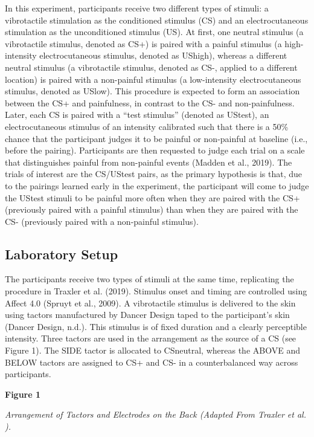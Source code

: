 \documentclass{article}
\begin{document}
In this experiment, participants receive two different types of stimuli: a vibrotactile stimulation as the conditioned stimulus (CS) and an electrocutaneous stimulation as the unconditioned stimulus (US). At first, one neutral stimulus (a vibrotactile stimulus, denoted as CS+) is paired with a painful stimulus (a high-intensity electrocutaneous stimulus, denoted as UShigh), whereas a different neutral stimulus (a vibrotactile stimulus, denoted as CS-, applied to a different location) is paired with a non-painful stimulus (a low-intensity electrocutaneous stimulus, denoted as USlow). This procedure is expected to form an association between the CS+ and painfulness, in contrast to the CS- and non-painfulness. Later, each CS is paired with a “test stimulus” (denoted as UStest), an electrocutaneous stimulus of an intensity calibrated such that there is a 50\% chance that the participant judges it to be painful or non-painful at baseline (i.e., before the pairing). Participants are then requested to judge each trial on a scale that distinguishes painful from non-painful events (Madden et al., 2019). The trials of interest are the CS/UStest pairs, as the primary hypothesis is that, due to the pairings learned early in the experiment, the participant will come to judge the UStest stimuli to be painful more often when they are paired with the CS+ (previously paired with a painful stimulus) than when they are paired with the CS- (previously paired with a non-painful stimulus).

\subsection{Laboratory Setup}

The participants receive two types of stimuli at the same time, replicating the procedure in Traxler et al. (2019). Stimulus onset and timing are controlled using Affect 4.0 (Spruyt et al., 2009). A vibrotactile stimulus is delivered to the skin using tactors manufactured by Dancer Design taped to the participant's skin (Dancer Design, n.d.). This stimulus is of fixed duration and a clearly perceptible intensity. Three tactors are used in the arrangement as the source of a CS (see Figure 1). The SIDE tactor is allocated to CSneutral, whereas the ABOVE and BELOW tactors are assigned to CS+ and CS- in a counterbalanced way across participants.

\textbf{Figure 1}

\emph{Arrangement of Tactors and Electrodes on the Back (Adapted From Traxler et al. }\autocite{Traxler2019}\emph{).}
\end{document}
